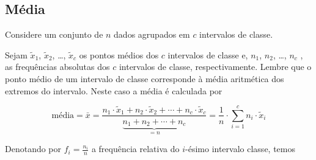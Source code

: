 {{{%









\clearpage

\label{\detokenize{PE104-A:sec-para-saber-mais}}\label{\detokenize{PE104-A::doc}}\label{\detokenize{PE104-A:para-saber-mais}}


\subsection{Média}

Considere um conjunto de \(n\) dados agrupados em \(c\) intervalos de classe.

Sejam \(\tilde{x}_{1}\), \(\tilde{x}_{2}\), \dots, \(\tilde{x}_{c}\) os pontos médios dos \(c\) intervalos de classe e, \(n_1\), \(n_2\), \dots, \(n_c\) ,  as frequências absolutas dos \(c\) intervalos de classe, respectivamente. Lembre que o ponto médio de um intervalo de classe  corresponde à média aritmética dos extremos do intervalo. Neste caso a média é calculada por

$$\text{média}=\bar{x}=\frac{n_1\cdot \tilde{x}_{1}+n_2\cdot \tilde{x}_{2}+\cdots+n_c\cdot \tilde{x}_{c}}{\underbrace{n_1+n_2+\cdots+n_c}_{=n}}=\frac{1}{n}\cdot \displaystyle{\sum^c_{i=1}}n_i\cdot \tilde{x}_i$$

Denotando por \(f_i=\frac{n_i}{n}\) a frequência relativa do \(i\)-ésimo intervalo classe, temos

}}}
